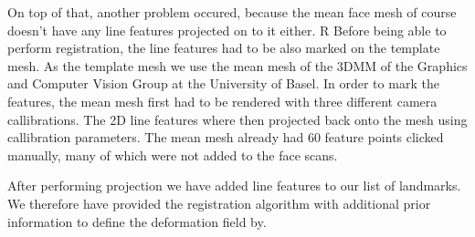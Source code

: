On top of that, another problem occured, because the mean face mesh of course doesn't have any line features projected on to it either.
R
Before being able to perform registration, the line features had to be also marked on the template mesh. As the template mesh we use the mean mesh of the 3DMM of the Graphics and Computer Vision Group at the University of Basel. In order to mark the features, the mean mesh first had to be rendered with three different camera callibrations. The 2D line features where then projected back onto the mesh using callibration parameters. The mean mesh already had 60 feature points
clicked manually, many of which were not added to the face scans.

After performing projection we have added line features to our list of landmarks. We therefore have provided the registration algorithm with additional prior information to define the deformation field by.
